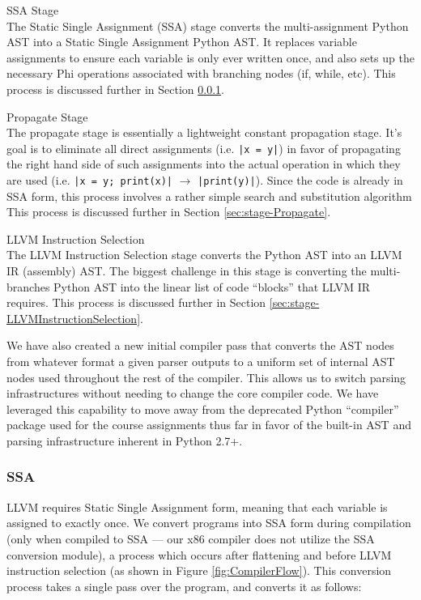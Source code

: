 \documentclass[11pt,twocolumn]{article}
\newenvironment{packed_desc}{
\begin{description}
  \setlength{\itemsep}{1pt}
  \setlength{\parskip}{0pt}
  \setlength{\parsep}{0pt}
}{\end{description}}
\begin{document}
\begin{packed_desc}
\item[SSA Stage] \hfill \\
  The Static Single Assignment (SSA) stage converts
  the multi-assignment Python AST into a Static Single Assignment
  Python AST. It replaces variable assignments to ensure each variable
  is only ever written once, and also sets up the necessary Phi operations
  associated with branching nodes (if, while, etc).
  This process is discussed further in Section \ref{sec:stage-SSA}.
\item[Propagate Stage] \hfill \\
  The propagate stage is essentially a
  lightweight constant propagation stage. It's goal is to eliminate
  all direct assignments (i.e. \texttt{|x = y|}) in favor of propagating
  the right hand side of such assignments into the actual operation in
  which they are used (i.e. \texttt{|x = y; print(x)|} $\rightarrow$
  \texttt{|print(y)|}). Since the code is already in SSA form, this
  process involves a rather simple search and substitution algorithm
  This process is discussed further in Section \ref{sec:stage-Propagate}.
\item[LLVM Instruction Selection] \hfill \\
  The LLVM Instruction Selection stage
  converts the Python AST into an LLVM IR (assembly) AST. The biggest
  challenge in this stage is converting the multi-branches Python AST
  into the linear list of code ``blocks'' that LLVM IR requires. This
  process is discussed further in Section
  \ref{sec:stage-LLVMInstructionSelection}.
\end{packed_desc}

We have also created a new initial compiler pass that converts the AST
nodes from whatever format a given parser outputs to a uniform set of
internal AST nodes used throughout the rest of the compiler. This
allows us to switch parsing infrastructures without needing to change
the core compiler code. We have leveraged this capability to move away
from the deprecated Python ``compiler'' package used for the course
assignments thus far in favor of the built-in AST and parsing
infrastructure inherent in Python 2.7+.

\subsubsection{SSA}
\label{sec:stage-SSA}

LLVM requires Static Single Assignment form, meaning that each
variable is assigned to exactly once.  We convert programs into SSA
form during compilation (only when compiled to SSA --- our x86
compiler does not utilize the SSA conversion module), a process which
occurs after flattening and before LLVM instruction
selection (as shown in Figure \ref{fig:CompilerFlow}).  This
conversion process takes a single pass over the program, and converts
it as follows:
\end{document}
